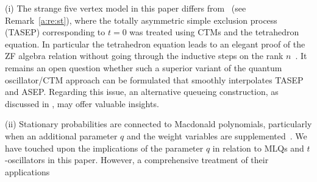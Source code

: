 (i) The strange five vertex model in this paper differs from~\cite{KMO1,KMO2} 
(see Remark~\ref{a:re:st}), where 
the totally asymmetric simple exclusion process (TASEP) corresponding to $t=0$
was treated using CTMs and the tetrahedron equation.
In particular the tetrahedron equation leads to an elegant proof of the ZF algebra relation 
without going through the inductive steps on the rank $n$~\cite{KMO2,K22}.
It remains an open question whether such a superior variant of the quantum 
oscillator/CTM approach can be formulated that smoothly interpolates 
TASEP and ASEP.
Regarding this issue, an alternative queueing construction, 
as discussed in \cite[Sec.7]{Martin20}, may offer valuable insights.


(ii) Stationary probabilities are connected to Macdonald polynomials,
particularly when an additional parameter $q$ 
and the weight variables are supplemented~\cite{CDW,CMW,DW}.
We have touched upon the implications of the parameter $q$ 
in relation to MLQs and $t$-oscillators in this paper.
However, a comprehensive treatment of their applications 
